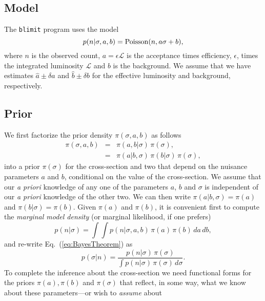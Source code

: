 \documentclass[preprint,eqsecnum,aps]{revtex4}
\newcommand{\poisson}[2]{{\rm Poisson}(#1, #2)}
\newcommand{\ha}{\hat{a}}
\newcommand{\hb}{\hat{b}}
\newcommand{\da}{\delta a}
\newcommand{\db}{\delta b}
\newcommand{\lum}{{\mathcal L}}
\newcommand{\prior}[1]{\pi(#1)}
\newcommand{\pdf}[2]{p(#1|#2)}
\newcommand{\Eq}[1]{Eq.\ (\ref{eq:#1})}
\begin{document}
\subsection{Model}
The {\tt blimit} program uses the model 
\begin{equation}
\label{eq:Model}
    \pdf{n}{\sigma, a, b} = \poisson{n}{a \sigma + b},
\end{equation}
where $n$ is the observed count, $a = \epsilon \lum$ is the 
acceptance times efficiency, $\epsilon$, 
times the integrated luminosity $\lum$ and
 $b$ is the background. We assume that we have estimates $\ha \pm \da$ and
$\hb \pm \db$ for the effective luminosity and background, respectively.

\subsection{Prior}
We first factorize the prior density $\prior{\sigma, a, b}$ as follows
\begin{eqnarray}
    \prior{\sigma, a, b} 	& = & 
					\prior{a, b|\sigma} \,
    					\prior{\sigma}, \nonumber \\
				& = & 	\prior{a | b,\sigma} \,
					\prior{b | \sigma} \,
    			\prior{\sigma},
\end{eqnarray}
into a prior $\prior{\sigma}$ for the cross-section
and two that depend on the nuisance parameters $a$ and $b$, 
conditional on the
value of the cross-section. We assume that our {\em a priori} knowledge of
any one of the parameters
$a$, $b$ and $\sigma$ is independent of our {\em a priori} knowledge of
the other two. 
We can then write $\prior{a| b, \sigma} = \prior{a}$ and
$\prior{b | \sigma} = \prior{b}$. 
Given $\prior{a}$ and $\prior{b}$, it is convenient first to 
compute the {\em marginal
model density} (or marginal likelihood, if one prefers)
\begin{equation}
\label{eq:MarginalDensity} 
\pdf{n}{\sigma} = \int \int 
\pdf{n}{\sigma, a, b} \, \prior{a} \, \prior{b} \, da \, db ,
\end{equation}
and re-write \Eq{BayesTheorem} as
\begin{equation}
\label{eq:bayesTheorem} \pdf{\sigma}{n} =
\frac{\pdf{n}{\sigma} \, \prior{\sigma} }{\int \pdf{n}{\sigma}
\, \prior{\sigma} \, d\sigma}.
\end{equation}
To complete the inference about the cross-section 
we need functional forms for the priors
$\prior{a}, \prior{b}$ and $\prior{\sigma}$ that reflect, in some
way, what we know about these parameters---or wish to {\em assume} about
\end{document}
